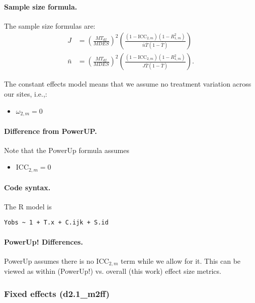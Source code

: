 \documentclass[12pt]{article}
\begin{document}
\paragraph{Sample size formula.} 
The sample size formulas are:
\begin{align}
J &= \left(\frac{MT_{df}}{MDES}\right)^2 \left(\frac{(1-\text{ICC}_{2,m})(1-R^2_{1,m})}{\bar{n} \bar{T} (1 - \bar{T})} \right)\\
\bar{n} &= \left(\frac{MT_{df}}{MDES}\right)^2 \left(\frac{(1-\text{ICC}_{2,m})(1-R^2_{1,m})}{J \bar{T} (1 - \bar{T})} \right) .
\end{align}

The constant effects model means that we assume no treatment variation across our sites, i.e.,:
\begin{itemize}
\item $\omega_{2,m} = 0$
\end{itemize}

\paragraph{Difference from PowerUP.}

Note that the PowerUp formula assumes
\begin{itemize}
\item $\text{ICC}_{2,m} = 0$
\end{itemize}

\paragraph{Code syntax.}
The R model is
\begin{verbatim}
Yobs ~ 1 + T.x + C.ijk + S.id
\end{verbatim}


\paragraph{PowerUp! Differences.}
PowerUp assumes there is no $\text{ICC}_{2,m}$ term while we allow for it.
This can be viewed as within (PowerUp!) vs. overall (this work) effect size metrics.


\newpage 
\subsubsection{Fixed effects (d2.1\_m2ff)}
\end{document}
